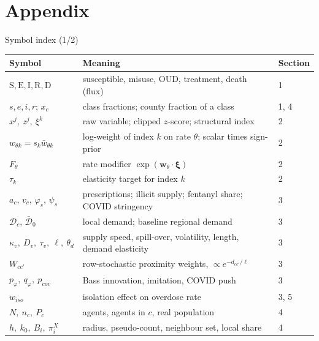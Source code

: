 ﻿\documentclass[9pt,aspectratio=169]{beamer}
\newcommand{\Sc}{\mathrm{S}}\newcommand{\Ec}{\mathrm{E}}\newcommand{\Ic}{\mathrm{I}}\newcommand{\Rc}{\mathrm{R}}\newcommand{\Dc}{\mathrm{D}}
\begin{document}
\appendix
\section{Appendix}
\begin{frame}{Symbol index (1/2)}
 \footnotesize
 \renewcommand{\arraystretch}{1.3}
 \begin{tabularx}{\textwidth}{@{}l X l@{}}
 \toprule Symbol & Meaning & Section\\\midrule
 $\Sc,\Ec,\Ic,\Rc,\Dc$ & susceptible, misuse, OUD, treatment, death (flux) & 1\\
 $s,e,i,r$; $x_c$ & class fractions; county fraction of a class & 1, 4\\
 $x^j,\ z^j,\ \xi^k$ & raw variable; clipped $z$-score; structural index & 2\\
 $w_{\theta k}=s_k\bar w_{\theta k}$ & log-weight of index $k$ on rate $\theta$; scalar times sign-prior & 2\\
 $F_\theta$ & rate modifier $\exp(\bm w_\theta\cdot\bm\xi)$ & 2\\
 $\tau_k$ & elasticity target for index $k$ & 2\\
 $a_c$, $v_c$, $\varphi_s$, $\psi_s$ & prescriptions; illicit supply; fentanyl share; COVID stringency & 3\\
 $\mathcal D_c$, $\bar{\mathcal D}_0$ & local demand; baseline regional demand & 3\\
 $\kappa_v,\ D_v,\ \tau_v,\ \ell,\ \theta_d$ & supply speed, spill-over, volatility, length, demand elasticity & 3\\
 $W_{cc'}$ & row-stochastic proximity weights, $\propto e^{-d_{cc'}/\ell}$ & 3\\
 $p_\varphi,\ q_\varphi,\ p_{cov}$ & Bass innovation, imitation, COVID push & 3\\
 $w_{iso}$ & isolation effect on overdose rate & 3, 5\\
 $N,\ n_c,\ P_c$ & agents, agents in $c$, real population & 4\\
 $h,\ k_0,\ B_i,\ \pi^X_i$ & radius, pseudo-count, neighbour set, local share & 4\\
 \bottomrule
 \end{tabularx}
\end{frame}
\end{document}
